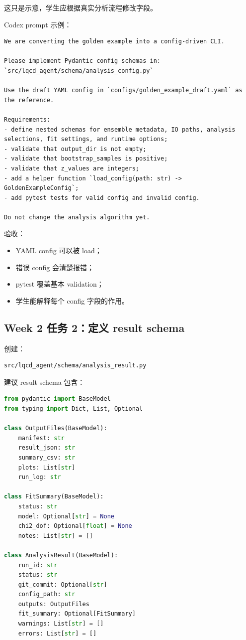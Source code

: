 \documentclass[11pt,a4paper,fontset=fandol]{ctexart}
\begin{document}
这只是示意，学生应根据真实分析流程修改字段。

Codex prompt 示例：

\begin{lstlisting}
We are converting the golden example into a config-driven CLI.

Please implement Pydantic config schemas in:
`src/lqcd_agent/schema/analysis_config.py`

Use the draft YAML config in `configs/golden_example_draft.yaml` as the reference.

Requirements:
- define nested schemas for ensemble metadata, IO paths, analysis selections, fit settings, and runtime options;
- validate that output_dir is not empty;
- validate that bootstrap_samples is positive;
- validate that z_values are integers;
- add a helper function `load_config(path: str) -> GoldenExampleConfig`;
- add pytest tests for valid config and invalid config.

Do not change the analysis algorithm yet.
\end{lstlisting}

验收：

\begin{itemize}[leftmargin=2em]
  \item YAML config 可以被 load；
  \item 错误 config 会清楚报错；
  \item pytest 覆盖基本 validation；
  \item 学生能解释每个 config 字段的作用。
\end{itemize}

\subsection{Week 2 任务 2：定义 result schema}

创建：

\begin{lstlisting}
src/lqcd_agent/schema/analysis_result.py
\end{lstlisting}

建议 result schema 包含：

\begin{lstlisting}[language=Python]
from pydantic import BaseModel
from typing import Dict, List, Optional

class OutputFiles(BaseModel):
    manifest: str
    result_json: str
    summary_csv: str
    plots: List[str]
    run_log: str

class FitSummary(BaseModel):
    status: str
    model: Optional[str] = None
    chi2_dof: Optional[float] = None
    notes: List[str] = []

class AnalysisResult(BaseModel):
    run_id: str
    status: str
    git_commit: Optional[str]
    config_path: str
    outputs: OutputFiles
    fit_summary: Optional[FitSummary]
    warnings: List[str] = []
    errors: List[str] = []
\end{lstlisting}
\end{document}
